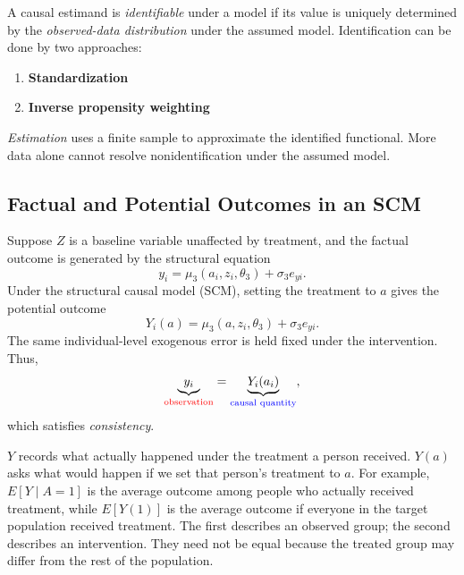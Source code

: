 \documentclass[11pt,twoside]{article}
\begin{document}

\begin{definition}
A causal estimand is \emph{identifiable} under a model if its value is uniquely determined by the \emph{observed-data distribution} under the assumed model. Identification can be done by two approaches:
\begin{enumerate}
    \item \textbf{Standardization}
    \item \textbf{Inverse propensity weighting}
\end{enumerate}


\emph{Estimation} uses a finite sample to approximate the identified functional. More data alone cannot resolve nonidentification under the assumed model.
\end{definition}



\subsection{Factual and Potential Outcomes in an SCM}

Suppose $Z$ is a baseline variable unaffected by treatment, and the factual outcome is generated by the structural equation
\begin{equation}
\label{eq:factual-outcome}
    y_i = \mu_3(a_i,z_i,\theta_3) + \sigma_3 e_{yi}.
\end{equation}
Under the structural causal model (SCM), setting the treatment to $a$
 gives the potential outcome
\begin{equation}
\label{eq:potential-outcome}
    Y_i(a) = \mu_3(a,z_i,\theta_3) + \sigma_3 e_{yi}.
\end{equation}
The same individual-level exogenous error is held fixed under the
 intervention. Thus,
\begin{equation}
\label{eq:consistency}
    \underbrace{y_i}_{\textcolor{red}{\text{observation}}}
    = \underbrace{Y_i(a_i)}_{\textcolor{blue}{\text{causal quantity}}},
\end{equation}
which satisfies \emph{consistency}.

\begin{remark}
$Y$ records what actually happened under the treatment a person received. $Y(a)$ asks what would happen if we set that person's treatment to $a$. For example, $E[Y\mid A=1]$ is the average outcome among people who actually received treatment, while $E[Y(1)]$ is the average outcome if everyone in the target population received treatment. The first describes an observed group; the second describes an intervention. They need not be equal because the treated group may differ from the rest of the population.
\end{remark}
\end{document}
